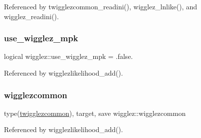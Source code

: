 Referenced by twigglezcommon\+\_\+readini(), wigglez\+\_\+lnlike(), and wigglez\+\_\+readini().

\mbox{\label{namespacewigglez_a3827c735a7a159656e581a2e19c567a2}} 
\subsubsection{\texorpdfstring{use\+\_\+wigglez\+\_\+mpk}{use\_wigglez\_mpk}}
{\footnotesize\ttfamily logical wigglez\+::use\+\_\+wigglez\+\_\+mpk = .false.\hspace{0.3cm}{\ttfamily [private]}}



Referenced by wigglezlikelihood\+\_\+add().

\mbox{\label{namespacewigglez_a1a7784e6e8553a1ae1cf8a3eb8276341}} 
\subsubsection{\texorpdfstring{wigglezcommon}{wigglezcommon}}
{\footnotesize\ttfamily type(\mbox{\hyperlink{structwigglez_1_1twigglezcommon}{twigglezcommon}}), target, save wigglez\+::wigglezcommon\hspace{0.3cm}{\ttfamily [private]}}



Referenced by wigglezlikelihood\+\_\+add().

